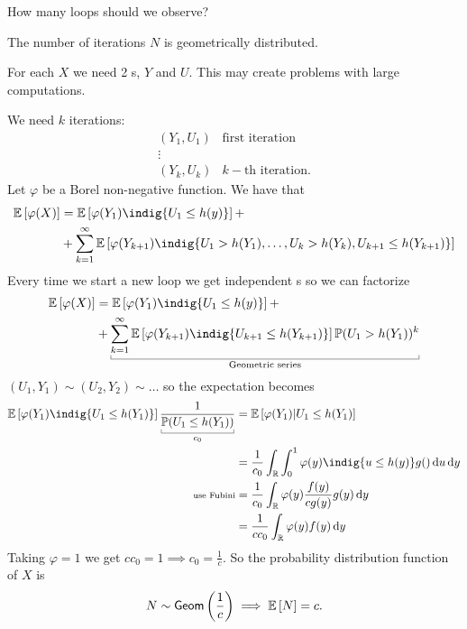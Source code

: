 \documentclass[12pt]{report}
\begin{document}
\begin{enumerate}[\circnum]
	How many loops should we observe?
	\begin{remark}
		The number of iterations $N$ is geometrically distributed.
	\end{remark}
	For each \rv{} $X$ we need 2 \rv s, $Y$ and $U$. This may create problems with large computations.
	\begin{fancyproof}
		We need $k$ iterations:
		\begin{equation*}
			\begin{array}{cl}
				(Y_{1},U_{1})&\text{first iteration}\\
				\vdots\\
				(Y_{k},U_{k})&k-\text{th iteration.}
			\end{array}
		\end{equation*}
		Let $\varphi$ be a Borel non-negative function. We have that
		\begin{align*}
			\ev{\varphi(X)}&=\ev{\varphi(Y_{1})\indig{U_{1}\leq h(y)}}+\\
			&+\sum_{k=1}^{\infty}\ev{\varphi(Y_{k+1})\indig{U_{1}>h(Y_{1}),\ldots,U_{k}>h(Y_{k}),U_{k+1}\leq h(Y_{k+1})}}
		\end{align*}
		Every time we start a new loop we get independent \rv s so we can factorize
		\begin{align*}
			\ev{\varphi(X)}&=\ev{\varphi(Y_{1})\indig{U_{1}\leq h(y)}}+\\
			&+\ubracketthin{\sum_{k=1}^{\infty}\ev{\varphi(Y_{k+1})\indig{U_{k+1}\leq h(Y_{k+1})}}\pr(U_{1}>h(Y_{1}))^{k}}_{\claptext{Geometric series}}
		\end{align*}
		$(U_{1},Y_{1})\sim(U_{2},Y_{2})\sim\ldots$ so the expectation becomes
		\begin{align*}
			\ev{\varphi(Y_{1})\indig{U_{1}\leq h(Y_{1})}}\frac{1}{\ubracketthin{\pr(U_{1}\leq h(Y_{1}))}_{c_{0}}}&=\ev{\varphi(Y_{1})|U_{1}\leq h(Y_{1})}\\
			&=\frac{1}{c_{0}}\int_{\R}\int_{0}^{1}\varphi(y)\indig{u\leq h(y)}g()\du\dy\\
			\text{\scriptsize use Fubini}&=\frac{1}{c_0}\int_{\R}\varphi(y)\frac{f(y)}{cg(y)}g(y)\dy\\
			&=\frac{1}{cc_{0}}\int_{\R}\varphi(y)f(y)\dy
		\end{align*}
		Taking $\varphi=1$ we get $cc_0=1\implies c_{0}=\frac{1}{c}$. So the probability distribution function of $X$ is
		\begin{equation*}
			N\sim\mathsf{Geom}\left(\frac{1}{c}\right)\implies\mathbb{E}\left[N\right]=c.
		\end{equation*}
	\end{fancyproof}

\end{enumerate}
\end{document}
